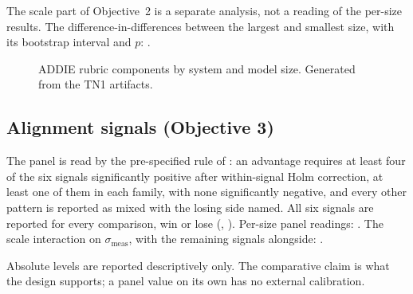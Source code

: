 The scale part of Objective~2 is a separate analysis, not a reading of the per-size
results. The difference-in-differences between the largest and smallest size, with
its bootstrap interval and $p$: \TBD.

\begin{table}[t]
  \caption{LLM judge scores by system and model size, with per-cell $n$. Generated
  from the TN1 artifacts.}
  \label{tab:rq1-ladder}
  \small
  \centering
\end{table}

\begin{figure}[t]
  \centering
  \caption{ADDIE rubric components by system and model size. Generated from the TN1
  artifacts.}
  \label{fig:rq1-components}
\end{figure}

\subsection{Alignment signals (Objective 3)}
\label{sec:rq2}

The panel is read by the pre-specified rule of : an
advantage requires at least four of the six signals significantly positive after
within-signal Holm correction, at least one of them in each family, with none
significantly negative, and every other
pattern is reported as mixed with the losing side named. All six signals are reported
for every comparison, win or lose (,
). Per-size panel readings: \TBD. The scale
interaction on
$\sigma_{\mathrm{meas}}$, with the remaining signals alongside: \TBD.

Absolute levels are reported descriptively only. The comparative claim is what the
design supports; a panel value on its own has no external calibration.

\begin{table}[t]
  \caption{The six alignment signals by system and model size, with per-cell $n$.
  Generated from the TN1 artifacts.}
  \label{tab:rq2-panel}
  \small
  \centering
\end{table}

